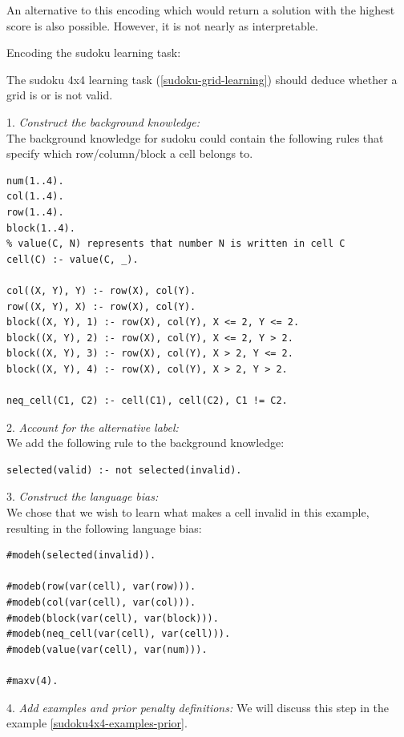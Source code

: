 An alternative to this encoding which would return a solution with the highest score is also possible. However, it is not nearly as interpretable.

\begin{example}
\label{sudoku-binary-example}
Encoding the sudoku learning task:

The sudoku 4x4 learning task (\ref{sudoku-grid-learning}) should deduce whether a grid is or is not valid.

1. \textit{Construct the background knowledge:} \\
The background knowledge for sudoku could contain the following rules that specify which row/column/block a cell belongs to.
\begin{verbatim}
num(1..4).
col(1..4).
row(1..4).
block(1..4).
% value(C, N) represents that number N is written in cell C
cell(C) :- value(C, _).

col((X, Y), Y) :- row(X), col(Y).
row((X, Y), X) :- row(X), col(Y).
block((X, Y), 1) :- row(X), col(Y), X <= 2, Y <= 2.
block((X, Y), 2) :- row(X), col(Y), X <= 2, Y > 2.
block((X, Y), 3) :- row(X), col(Y), X > 2, Y <= 2.
block((X, Y), 4) :- row(X), col(Y), X > 2, Y > 2.

neq_cell(C1, C2) :- cell(C1), cell(C2), C1 != C2.
\end{verbatim}

2. \textit{Account for the alternative label:} \\
We add the following rule to the background knowledge:
\begin{verbatim}
selected(valid) :- not selected(invalid). 
\end{verbatim}

3. \textit{Construct the language bias:} \\
We chose that we wish to learn what makes a cell invalid in this example, resulting in the following language bias:
\begin{verbatim}
#modeh(selected(invalid)).

#modeb(row(var(cell), var(row))).
#modeb(col(var(cell), var(col))).
#modeb(block(var(cell), var(block))).
#modeb(neq_cell(var(cell), var(cell))).
#modeb(value(var(cell), var(num))).

#maxv(4).
\end{verbatim}

4. \textit{Add examples and prior penalty definitions:}
We will discuss this step in the example \ref{sudoku4x4-examples-prior}.
\end{example}

